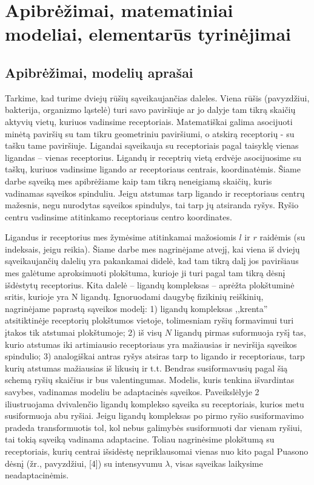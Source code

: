 \documentclass[10pt]{article}
\begin{document}
\section{Apibrėžimai, matematiniai modeliai, elementarūs tyrinėjimai}

\subsection{Apibrėžimai, modelių aprašai}
Tarkime, kad turime dviejų rūšių sąveikaujančias daleles. Viena rūšis (pavyzdžiui, bakterija, organizmo ląstelė) turi savo paviršiuje ar jo dalyje tam tikrą skaičių aktyvių vietų, kuriuos  vadinsime receptoriais. Matematiškai galima asocijuoti minėtą paviršių su tam tikru geometriniu paviršiumi, o atskirą receptorių -  su tašku tame paviršiuje. Ligandai  sąveikauja su receptoriais pagal taisyklę vienas ligandas – vienas receptorius.  Ligandų ir receptrių vietą erdvėje asocijuosime su taškų, kuriuos vadinsime ligando ar receptoriaus centrais, koordinatėmis. Šiame darbe sąveiką mes apibrėžiame kaip tam tikrą neneigiamą skaičių, kuris vadinamas sąveikos spinduliu. Jeigu atstumas tarp ligando ir receptoriaus centrų mažesnis, negu nurodytas sąveikos spindulys, tai tarp jų atsiranda ryšys. Ryšio centru vadinsime atitinkamo receptoriaus centro koordinates.

Ligandus ir receptorius mes žymėsime atitinkamai  mažosiomis  $l$ ir $r$ raidėmis (su indeksais, jeigu reikia). Šiame darbe mes nagrinėjame atvejį, kai viena iš dviejų sąveikaujančių dalelių yra pakankamai didelė, kad tam tikrą dalį jos paviršiaus mes galėtume aproksimuoti plokštuma, kurioje ji turi  pagal tam tikrą dėsnį išdėstytų  receptorius. Kita dalelė – ligandų kompleksas –  aprėžta plokštuminė sritis, kurioje yra N  ligandų. Ignoruodami daugybę fizikinių  reiškinių, nagrinėjame paprastą  sąveikos  modelį: 
       1)   ligandų kompleksas ,,krenta'' atsitiktinėje receptorių plokštumos vietoje, tolimesniam ryšių formavimui turi įtakos tik atstumai plokštumoje;
        	2)    iš visų $N$ ligandų pirmas suformuoja ryšį tas, kurio atstumas iki artimiausio receptoriaus yra  mažiausias ir neviršija sąveikos spindulio;
            	3)  analogiškai antras ryšys atsiras tarp to ligando ir receptoriaus, tarp kurių atstumas mažiausias iš likusių ir t.t.  
          Bendras susiformavusių pagal šią schemą ryšių skaičius  ir bus valentingumas. Modelis, kuris tenkina išvardintas savybes, vadinamas modeliu  be adaptacinės sąveikos. Paveikslėlyje 2 iliustruojama dvivalenčio ligandų komplekso sąveika su receptoriais, kurios metu susiformuoja  abu ryšiai. Jeigu ligandų kompleksas po pirmo ryšio susiformavimo pradeda transformuotis tol, kol nebus galimybės susiformuoti dar vienam ryšiui, tai tokią sąveiką vadinama  adaptacine.  Toliau nagrinėsime plokštumą su receptoriais, kurių centrai išsidėstę nepriklausomai vienas nuo kito pagal Puasono dėsnį (žr., pavyzdžiui, [4]) su intensyvumu $\lambda$, visas sąveikas laikysime neadaptacinėmis. 
\end{document}
